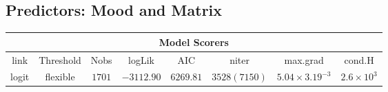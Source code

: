 \subsection{Predictors: Mood and Matrix}
\begin{minipage}{\linewidth}
\begin{tabular}{|c|c|c|c|c|c|c|c|}
\hline
\multicolumn{8}{|c|}{Model Scorers}\\\hline
link  &  Threshold & Nobs & logLik & AIC & niter & max.grad & cond.H\\\hline
logit & flexible & $1701$ & $-3112.90$ & $6269.81$ & $3528(7150)$ & $5.04\times 3.19^{-3}$ & $2.6\times 10^{3}$\\\hline
\end{tabular}
\end{minipage}
\newline
\newline
\newline

